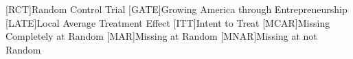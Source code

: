 \begin{acronym}
	[RCT]{Random Control Trial}
	[GATE]{Growing America through Entrepreneurship}
      	[LATE]{Local Average Treatment Effect}
	[ITT]{Intent to Treat}
	[MCAR]{Missing Completely at Random}
	[MAR]{Missing at Random}
	[MNAR]{Missing at not Random}
\end{acronym}
